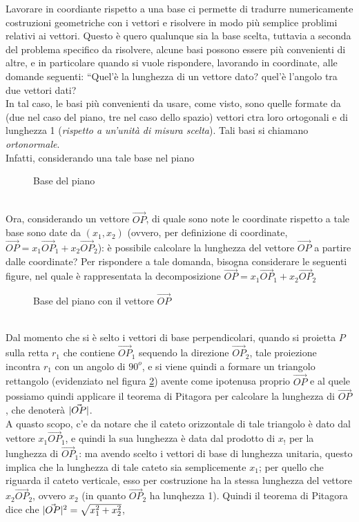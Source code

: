 Lavorare in coordiante rispetto a una base ci permette di tradurre numericamente costruzioni geometriche con i vettori e risolvere in modo più semplice problimi relativi ai vettori. Questo è quero qualunque sia la base scelta, tuttavia a seconda del problema specifico da risolvere, alcune basi possono essere più convenienti di altre, e in particolare quando si vuole rispondere, lavorando in coordinate, alle domande seguenti: ``Quel'è la lunghezza di un vettore dato? quel'è l'angolo tra due vettori dati?\\
In tal caso, le basi più convenienti da usare, come visto, sono quelle formate da (due nel caso del piano, tre nel caso dello spazio) vettori ctra loro ortogonali e di lunghezza 1 (\textit{rispetto a un'unità di misura scelta}). Tali basi si chiamano \textit{ortonormale}.\\
Infatti, considerando una tale base nel piano
\begin{figure}[ht!]
  \centering
  \resizebox{3cm}{!}{
      
    }
  \caption{Base del piano}
  \label{fig:basedelpiano}
\end{figure}\\
Ora, considerando un vettore $\vec{OP}$, di quale sono note le coordinate rispetto a tale base sono date da $(x_1,x_2)$ (ovvero, per definizione di coordinate, $\vec{OP}=x_1\vec{OP}_1+x_2\vec{OP}_2$): è possibile calcolare la lunghezza del vettore $\vec{OP}$ a partire dalle coordinate? Per rispondere a tale domanda, bisogna considerare le seguenti figure, nel quale è rappresentata la decomposizione $\vec{OP}=x_1\vec{OP}_1+x_2\vec{OP}_2$
\begin{figure}[ht!]
  \centering
  \resizebox{4cm}{!}{
      
    }
  \caption{Base del piano con il vettore $\vec{OP}$}
  \label{fig:basedelpianoConVettOP}
\end{figure}\\
Dal momento che si è selto i vettori di base perpendicolari, quando si proietta $P$ sulla retta $r_1$ che contiene $\vec{OP}_1$ sequendo la direzione $\vec{OP}_2$, tale proiezione incontra $r_1$ con un angolo di $90^o$, e si viene quindi a formare un triangolo rettangolo (evidenziato nel figura \ref{fig:basedelpianoConVettOP}) avente come ipotenusa proprio $\vec{OP}$ e al quele possiamo quindi applicare il teorema di Pitagora per calcolare la lunghezza di $\vec{OP}$, che denoterà $\lvert\vec{OP}\rvert$. \\
A quasto scopo, c'e da notare che il cateto orizzontale di tale triangolo è dato dal vettore $x_1\vec{OP}_1$, e quindi la sua lunghezza è data dal prodotto di $x_!$ per la lunghezza di $\vec{OP}_1$: ma avendo scelto i vettori di base di lunghezza unitaria, questo implica che la lunghezza di tale cateto sia semplicemente $x_1$; per quello che riguarda il cateto verticale, esso per costruzione ha la stessa lunghezza del vettore $x_2\vec{OP}_2$, ovvero $x_2$ (in quanto $\vec{OP}_2$ ha lunqhezza 1). Quindi il teorema di Pitagora dice che $\lvert\vec{OP}\rvert^2=\sqrt{x_1^2+x_2^2}$,
